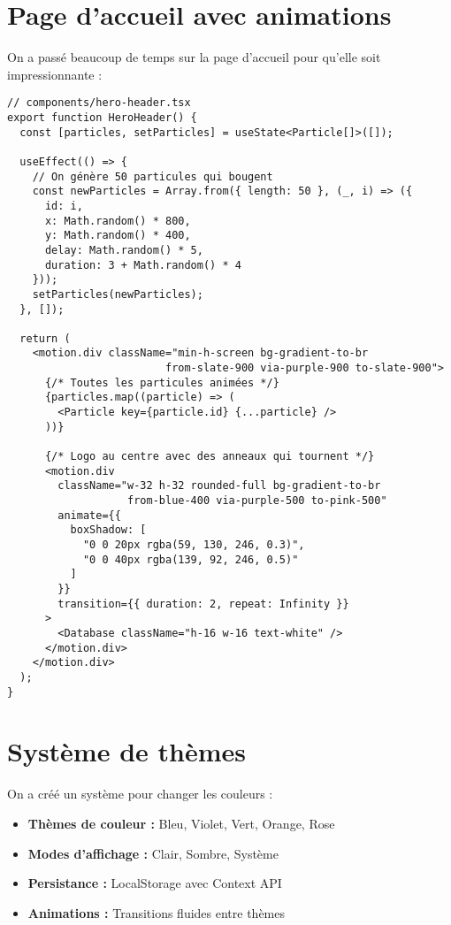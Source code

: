 \documentclass[12pt,a4paper]{report}
\begin{document}
\section{Page d'accueil avec animations}

On a passé beaucoup de temps sur la page d'accueil pour qu'elle soit impressionnante :

\begin{lstlisting}[caption=Génération de particules animées]
// components/hero-header.tsx
export function HeroHeader() {
  const [particles, setParticles] = useState<Particle[]>([]);

  useEffect(() => {
    // On génère 50 particules qui bougent
    const newParticles = Array.from({ length: 50 }, (_, i) => ({
      id: i,
      x: Math.random() * 800,
      y: Math.random() * 400,
      delay: Math.random() * 5,
      duration: 3 + Math.random() * 4
    }));
    setParticles(newParticles);
  }, []);

  return (
    <motion.div className="min-h-screen bg-gradient-to-br 
                         from-slate-900 via-purple-900 to-slate-900">
      {/* Toutes les particules animées */}
      {particles.map((particle) => (
        <Particle key={particle.id} {...particle} />
      ))}
      
      {/* Logo au centre avec des anneaux qui tournent */}
      <motion.div
        className="w-32 h-32 rounded-full bg-gradient-to-br 
                   from-blue-400 via-purple-500 to-pink-500"
        animate={{ 
          boxShadow: [
            "0 0 20px rgba(59, 130, 246, 0.3)", 
            "0 0 40px rgba(139, 92, 246, 0.5)"
          ] 
        }}
        transition={{ duration: 2, repeat: Infinity }}
      >
        <Database className="h-16 w-16 text-white" />
      </motion.div>
    </motion.div>
  );
}
\end{lstlisting}

\section{Système de thèmes}

On a créé un système pour changer les couleurs :

\begin{itemize}
    \item \textbf{Thèmes de couleur :} Bleu, Violet, Vert, Orange, Rose
    \item \textbf{Modes d'affichage :} Clair, Sombre, Système
    \item \textbf{Persistance :} LocalStorage avec Context API
    \item \textbf{Animations :} Transitions fluides entre thèmes
\end{itemize}
\end{document}
